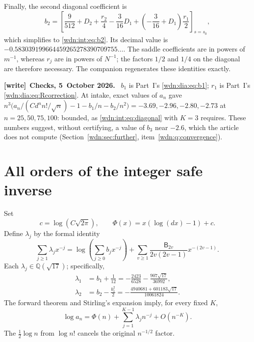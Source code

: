 \documentclass[11pt,letterpaper]{article}
\theoremstyle{remark}\newtheorem{remark}[theorem]{Remark}
\newcommand{\Q}{\mathbb Q}
\newenvironment{writenote}[1][]{\par\smallskip\begingroup\small
 \noindent\textbf{[write]}\if\relax\detokenize{#1}\relax\else~\textbf{#1.}\fi\ }%
 {\par\endgroup\smallskip}
\begin{document}
Finally, the second diagonal coefficient is
\begin{equation}\label{wdn:int:eq:b2product}
 b_2=\left[
 \frac9{512}+D_2+\frac{r_2}{4}-\frac3{16}D_1
       +\left(-\frac3{16}+D_1\right)\frac{r_1}{2}
 \right]_{s=s_0},
\end{equation}
which simplifies to \eqref{wdn:int:eq:b2}. Its decimal value is
$-0.583039199664459265278390709755\ldots$.
The saddle coefficients are in powers of $m^{-1}$, whereas $r_j$ are
in powers of $N^{-1}$; the factors $1/2$ and $1/4$ on the diagonal are
therefore necessary. The companion regenerates these identities exactly.

\begin{writenote}[Checks, 5~October 2026]
$b_1$ is Part~I's \eqref{wdn:dia:eq:b1}; $r_1$ is Part~I's \eqref{wdn:dia:eq:Rcorrection}. At intake, exact values of $a_n$ gave $n^3\bigl(a_n/(Cd^nn!/\sqrt n)-1-b_1/n-b_2/n^2\bigr)=-3.69,-2.96,-2.80,-2.73$ at $n=25,50,75,100$: bounded, as \eqref{wdn:int:eq:diagonal} with $K=3$ requires. These numbers suggest, without certifying, a value of $b_3$ near $-2.6$, which the article does not compute (Section~\ref{wdn:sec:further}, item~\ref{wdn:q:convergence}).
\end{writenote}

\section{All orders of the integer safe inverse}\label{wdn:int:sec:inverse}
Set
\begin{equation}\label{wdn:int:eq:Phi}
 c=\log(C\sqrt{2\pi}),\qquad
 \Phi(x)=x(\log(dx)-1)+c.
\end{equation}
Define $\lambda_j$ by the formal identity
\begin{equation}\label{wdn:int:eq:lambda}
 \sum_{j\ge1}\lambda_jx^{-j}
 =\log\left(\sum_{j\ge0}b_jx^{-j}\right)
       +\sum_{v\ge1}\frac{\mathsf B_{2v}}{2v(2v-1)}x^{-(2v-1)}.
\end{equation}
Each $\lambda_j\in\Q(\sqrt{17})$; specifically,
\begin{align}
 \lambda_1&=b_1+\frac1{12}
       =-\frac{2423}{6528}-\frac{907\sqrt{17}}{36992},\label{wdn:int:eq:lambda1}\\
 \lambda_2&=b_2-\frac{b_1^2}{2}
       =-\frac{4940681+601183\sqrt{17}}{10061824}.
 \label{wdn:int:eq:lambda2}
\end{align}
The forward theorem and Stirling's expansion imply, for every fixed $K$,
\begin{equation}\label{wdn:int:eq:loginteger}
 \log a_n=\Phi(n)+\sum_{j=1}^{K-1}\lambda_jn^{-j}+O(n^{-K}).
\end{equation}
The $\tfrac12\log n$ from $\log n!$ cancels the original
$n^{-1/2}$ factor.
\end{document}

